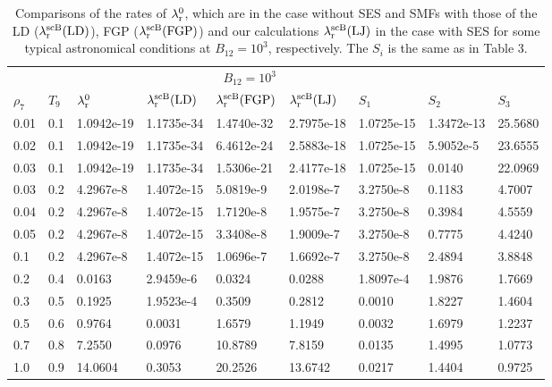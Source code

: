 \documentclass[manuscript]{aastex}
\begin{document}
\begin{table*}[htb]\footnotesize
\centering \caption{Comparisons of the rates of
$\lambda^0_{\rm{r}}$, which are in the case without SES and SMFs
with those of the
 LD ($\lambda^{\rm{scB}}_{\rm{r}}(\rm{LD})$), FGP ($\lambda^{\rm{scB}}_{\rm{r}}(\rm{FGP})$) and our calculations
$\lambda^{\rm{scB}}_{\rm{r}}(\rm{LJ})$ in the case with SES for some
typical astronomical conditions at $B_{12}=10^3$, respectively.
 The $S_i$ is the same as in Table 3.}
\begin{minipage}{140mm}
\begin{tabular}{lllllllll}
\hline \hline
\multicolumn{5}{r}{$B_{12}=10^{3}$} \\
\cline{4-6}
$\rho_7$ &$T_9$ & $\lambda^0_{\rm{r}}$ &$\lambda^{\rm{scB}}_{\rm{r}}(\rm{LD})$  &$\lambda^{\rm{scB}}_{\rm{r}}(\rm{FGP})$ &$\lambda^{\rm{scB}}_{\rm{r}}(\rm{LJ})$ &$S_{1}$ &$S_2$ &$S_3$\\
\hline

 0.01 &0.1 &1.0942e-19   &1.1735e-34  &1.4740e-32   &2.7975e-18   &1.0725e-15   &1.3472e-13  &25.5680\\
 0.02 &0.1 &1.0942e-19 &1.1735e-34 &6.4612e-24  &2.5883e-18 &1.0725e-15 &5.9052e-5 &23.6555\\
 0.03 &0.1 &1.0942e-19 &1.1735e-34 &1.5306e-21  &2.4177e-18 &1.0725e-15 &0.0140 & 22.0969\\
 0.03 &0.2 &4.2967e-8   &1.4072e-15  &5.0819e-9   &2.0198e-7   &3.2750e-8   &0.1183 &4.7007\\
 0.04 &0.2 &4.2967e-8 &1.4072e-15 &1.7120e-8   &1.9575e-7  &3.2750e-8 &0.3984 &4.5559\\
 0.05 &0.2 &4.2967e-8   &1.4072e-15  &3.3408e-8   &1.9009e-7   &3.2750e-8   &0.7775 &4.4240\\
 0.1  &0.2 &4.2967e-8   &1.4072e-15  &1.0696e-7   &1.6692e-7   &3.2750e-8   &2.4894  &3.8848\\
 0.2  &0.4 &0.0163  &2.9459e-6   &0.0324  &0.0288  &1.8097e-4   &1.9876  &1.7669\\
 0.3  &0.5 &0.1925  &1.9523e-4 &0.3509  &0.2812  &0.0010  &1.8227  &1.4604\\
 0.5  &0.6 &0.9764  &0.0031  &1.6579  &1.1949  &0.0032  &1.6979  &1.2237\\
 0.7  &0.8 &7.2550  &0.0976  &10.8789 &7.8159  &0.0135  &1.4995  &1.0773\\
 1.0  &0.9 &14.0604 &0.3053  &20.2526 &13.6742 &0.0217  &1.4404  &0.9725\\

\hline
\end{tabular}
\end{minipage}
\end{table*}
\end{document}
